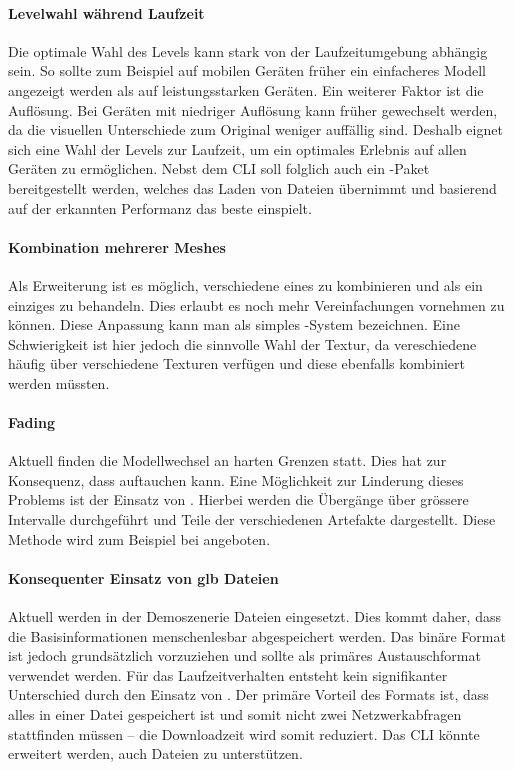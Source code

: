 \paragraph{Levelwahl während Laufzeit}
Die optimale Wahl des Levels kann stark von der Laufzeitumgebung abhängig sein. So sollte zum Beispiel auf mobilen Geräten früher ein einfacheres Modell angezeigt werden als auf leistungsstarken Geräten. Ein weiterer Faktor ist die Auflösung. Bei Geräten mit niedriger Auflösung kann früher gewechselt werden, da die visuellen Unterschiede zum Original weniger auffällig sind.
Deshalb eignet sich eine Wahl der Levels zur Laufzeit, um ein optimales Erlebnis auf allen Geräten zu ermöglichen.
Nebst dem \gls{CLI} soll folglich auch ein -Paket bereitgestellt werden, welches das Laden von  Dateien übernimmt und basierend auf der erkannten Performanz das beste  einspielt.

\paragraph{Kombination mehrerer Meshes}
Als Erweiterung ist es möglich, verschiedene  eines  zu kombinieren und als ein einziges  zu behandeln. Dies erlaubt es noch mehr Vereinfachungen vornehmen zu können. Diese Anpassung kann man als simples -System bezeichnen. Eine Schwierigkeit ist hier jedoch die sinnvolle Wahl der Textur, da vereschiedene  häufig über verschiedene Texturen verfügen und diese ebenfalls kombiniert werden müssten.

\pagebreak

\paragraph{Fading}
\label{chap:fading}
Aktuell finden die Modellwechsel an harten Grenzen statt. Dies hat zur Konsequenz, dass  auftauchen kann. Eine Möglichkeit zur Linderung dieses Problems ist der Einsatz von . Hierbei werden die Übergänge über grössere Intervalle durchgeführt und Teile der verschiedenen Artefakte dargestellt. Diese Methode wird zum Beispiel bei  angeboten.

\paragraph{Konsequenter Einsatz von glb Dateien}
Aktuell werden in der Demoszenerie  Dateien eingesetzt. Dies kommt daher, dass die Basisinformationen menschenlesbar abgespeichert werden. Das binäre Format  ist jedoch grundsätzlich  vorzuziehen und sollte als primäres Austauschformat verwendet werden. Für das Laufzeitverhalten entsteht kein signifikanter Unterschied durch den Einsatz von . Der primäre Vorteil des  Formats ist, dass alles in einer Datei gespeichert ist und somit nicht zwei Netzwerkabfragen stattfinden müssen – die Download\-zeit wird somit reduziert. Das \gls{CLI} könnte erweitert werden, auch  Dateien zu unterstützen.
